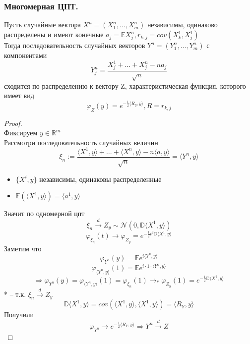 	\subsubsection{Многомерная ЦПТ.}
	\begin{theorem}
		Пусть случайные вектора $ X^n = (X^n_1,\ldots, X^n_m) $ независимы, одинаково распределены и имеют конечные $ a_j = \mathbb{E}X^n_j, r_{k,j} = cov(X^1_k, X^1_j) $\\
		Тогда последовательность случайных векторов $Y^n = (Y^n_1,\ldots, Y^n_m) $ с компонентами
		$$Y_j^n = \frac{X^1_j + \ldots + X^n_j - na_j}{\sqrt{n}}$$
		сходится по распределению к вектору Z, характеристическая функция, которого имеет вид
		$$\varphi_{Z}(y) = e^{-\frac{1}{2}\langle R_y,y\rangle}, R = r_{k,j}$$
	\end{theorem}
	\begin{proof}
		\text{ }\\
		Фиксируем $ y\in\mathbb{R}^m $\\
		Рассмотри последовательность случайных величин
		$$\xi_n:=\frac{\langle X^1, y\rangle + \ldots + \langle X^n, y\rangle - n\langle a, y\rangle}{\sqrt{n}} = \langle Y^n, y \rangle$$
		\begin{itemize}
			\item $\{X^i, y\}$ независимы, одинаковы распределенные
			\item $\mathbb{E}(\langle X^1, y\rangle) = \langle a^1, y\rangle$
		\end{itemize}
	Значит по одномерной цпт
	$$\xi_n\xrightarrow{d}Z_y\sim \mathcal{N}(0,\mathbb{D}\langle X^1, y\rangle)$$
	$$\varphi_{\xi_n}(t)\to\varphi_{Z_y} = e^{-\frac{1}{2}t^2\mathbb{D}\langle X^1, y\rangle}$$
	Заметим что
	$$\varphi_{Y^n}(y) = \mathbb{E}e^{i\langle Y^n, y\rangle}$$
	$$\varphi_{\langle Y^n, y\rangle}(1) = \mathbb{E}e^{i\cdot1\cdot\langle Y^n, y\rangle}$$
	$$\Rightarrow \varphi_{Y^n}(y) = \varphi_{\langle Y^n, y\rangle}(1) = \varphi_{\xi_n}(1) \to_{*} \varphi_{Z_y}(1) = e^{-\frac{1}{2}\mathbb{D}\langle X^1, y\rangle}$$
	* -- т.к. $ \xi_n\xrightarrow{d} Z_y $
	$$\mathbb{D}\langle X^1, y\rangle = cov(\langle X^1, y\rangle , \langle X^1, y\rangle ) = \langle R_Y, y\rangle $$
	Получили
	$$\varphi_{Y^n}\to e^{-\frac{1}{2}\langle R_Y, y\rangle } \Rightarrow Y^n\xrightarrow{d}Z$$
	\end{proof}